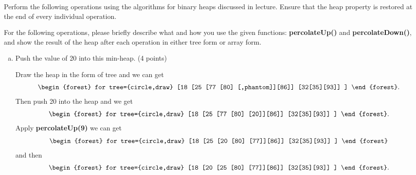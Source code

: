 \documentclass[11pt]{exam}
\begin{document}
Perform the following operations using the algorithms for binary heaps discussed in lecture. Ensure that the heap property is restored at the end of every individual operation.

For the following operations, please briefly describe what and how you use the given functions: \textbf{percolateUp()} and \textbf{percolateDown()}, and show the result of the heap after each operation in either tree form or array form.

\begin{enumerate}[a)]
    \item Push the value of 20 into this min-heap. (4 points)
          \begin{solution}
              Draw the heap in the form of tree and we can get\[
                  \begin{forest}
                      for tree={circle,draw}
                      [18
                          [25
                                  [77
                                          [80]
                                          [,phantom]][86]]
                          [32[35][93]]
                      ]
                  \end{forest}.\]
              Then push 20 into the heap and we get\[
                  \begin{forest}
                      for tree={circle,draw}
                      [18
                          [25
                                  [77
                                          [80]
                                          [20]][86]]
                          [32[35][93]]
                      ]
                  \end{forest}.\]
              Apply \textbf{percolateUp(9)} we can get\[
                  \begin{forest}
                      for tree={circle,draw}
                      [18
                          [25
                                  [20
                                          [80]
                                          [77]][86]]
                          [32[35][93]]
                      ]
                  \end{forest}\] and then\[
                  \begin{forest}
                      for tree={circle,draw}
                      [18
                          [20
                                  [25
                                          [80]
                                          [77]][86]]
                          [32[35][93]]
                      ]
                  \end{forest}.\]
          \end{solution}


\end{enumerate}
\end{document}
